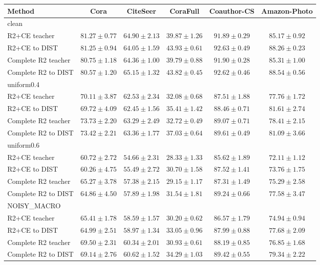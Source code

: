 \begin{tabular}{lccccc}
\hline
Method & Cora & CiteSeer & CoraFull & Coauthor-CS & Amazon-Photo \\
\hline
\multicolumn{6}{l}{clean} \\
R2+CE teacher & $81.27 \pm 0.77$ & $64.90 \pm 2.13$ & $39.87 \pm 1.26$ & $91.89 \pm 0.29$ & $85.17 \pm 0.92$ \\
R2+CE to DIST & $81.25 \pm 0.94$ & $64.05 \pm 1.59$ & $43.93 \pm 0.61$ & $92.63 \pm 0.49$ & $88.26 \pm 0.23$ \\
Complete R2 teacher & $80.75 \pm 1.18$ & $64.36 \pm 1.00$ & $39.79 \pm 0.88$ & $91.90 \pm 0.28$ & $85.31 \pm 1.00$ \\
Complete R2 to DIST & $80.57 \pm 1.20$ & $65.15 \pm 1.32$ & $43.82 \pm 0.45$ & $92.62 \pm 0.46$ & $88.54 \pm 0.56$ \\
\hline
\multicolumn{6}{l}{uniform0.4} \\
R2+CE teacher & $70.11 \pm 3.87$ & $62.53 \pm 2.34$ & $32.08 \pm 0.68$ & $87.51 \pm 1.88$ & $77.76 \pm 1.72$ \\
R2+CE to DIST & $69.72 \pm 4.09$ & $62.45 \pm 1.56$ & $35.41 \pm 1.42$ & $88.46 \pm 0.71$ & $81.61 \pm 2.74$ \\
Complete R2 teacher & $73.73 \pm 2.20$ & $63.29 \pm 2.49$ & $32.72 \pm 0.49$ & $89.07 \pm 0.71$ & $78.41 \pm 2.15$ \\
Complete R2 to DIST & $73.42 \pm 2.21$ & $63.36 \pm 1.77$ & $37.03 \pm 0.64$ & $89.61 \pm 0.49$ & $81.09 \pm 3.66$ \\
\hline
\multicolumn{6}{l}{uniform0.6} \\
R2+CE teacher & $60.72 \pm 2.72$ & $54.66 \pm 2.31$ & $28.33 \pm 1.33$ & $85.62 \pm 1.89$ & $72.11 \pm 1.12$ \\
R2+CE to DIST & $60.26 \pm 4.75$ & $55.49 \pm 2.72$ & $30.70 \pm 1.58$ & $87.52 \pm 1.41$ & $73.76 \pm 1.75$ \\
Complete R2 teacher & $65.27 \pm 3.78$ & $57.38 \pm 2.15$ & $29.15 \pm 1.17$ & $87.31 \pm 1.49$ & $75.29 \pm 2.58$ \\
Complete R2 to DIST & $64.86 \pm 4.50$ & $57.89 \pm 1.98$ & $31.54 \pm 1.81$ & $89.24 \pm 0.66$ & $77.58 \pm 3.47$ \\
\hline
\multicolumn{6}{l}{NOISY\_MACRO} \\
R2+CE teacher & $65.41 \pm 1.78$ & $58.59 \pm 1.57$ & $30.20 \pm 0.62$ & $86.57 \pm 1.79$ & $74.94 \pm 0.94$ \\
R2+CE to DIST & $64.99 \pm 2.51$ & $58.97 \pm 1.34$ & $33.05 \pm 0.96$ & $87.99 \pm 0.88$ & $77.68 \pm 2.09$ \\
Complete R2 teacher & $69.50 \pm 2.31$ & $60.34 \pm 2.01$ & $30.93 \pm 0.61$ & $88.19 \pm 0.85$ & $76.85 \pm 1.68$ \\
Complete R2 to DIST & $69.14 \pm 2.76$ & $60.62 \pm 1.52$ & $34.29 \pm 1.03$ & $89.42 \pm 0.55$ & $79.34 \pm 2.22$ \\
\hline
\end{tabular}
